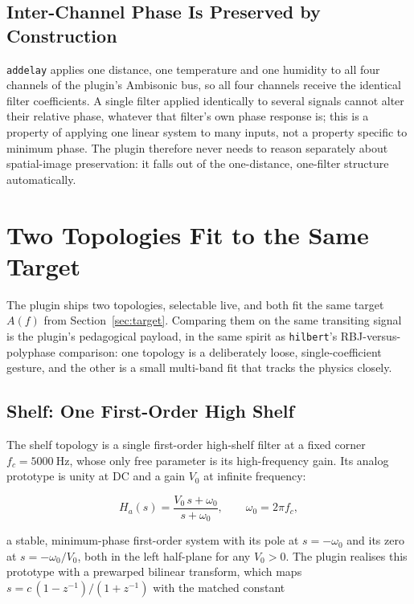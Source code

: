 \documentclass[11pt,a4paper]{article}
\begin{document}
\subsection{Inter-Channel Phase Is Preserved by Construction}

\texttt{addelay} applies one distance, one temperature and one humidity to all four channels of the plugin's Ambisonic bus, so all four channels receive the identical filter coefficients.
A single filter applied identically to several signals cannot alter their relative phase, whatever that filter's own phase response is; this is a property of applying one linear system to many inputs, not a property specific to minimum phase.
The plugin therefore never needs to reason separately about spatial-image preservation: it falls out of the one-distance, one-filter structure automatically.

\section{Two Topologies Fit to the Same Target}
\label{sec:topologies}

The plugin ships two topologies, selectable live, and both fit the same target $A(f)$ from Section~\ref{sec:target}.
Comparing them on the same transiting signal is the plugin's pedagogical payload, in the same spirit as \texttt{hilbert}'s RBJ-versus-polyphase comparison: one topology is a deliberately loose, single-coefficient gesture, and the other is a small multi-band fit that tracks the physics closely.

\subsection{Shelf: One First-Order High Shelf}
\label{sec:shelf}

The shelf topology is a single first-order high-shelf filter at a fixed corner $f_c = \SI{5000}{\hertz}$, whose only free parameter is its high-frequency gain.
Its analog prototype is unity at DC and a gain $V_0$ at infinite frequency:

\begin{equation}
H_a(s) = \frac{V_0 \, s + \omega_0}{s + \omega_0} ,
\qquad \omega_0 = 2\pi f_c ,
\end{equation}

a stable, minimum-phase first-order system with its pole at $s=-\omega_0$ and its zero at $s=-\omega_0/V_0$, both in the left half-plane for any $V_0 > 0$.
The plugin realises this prototype with a prewarped bilinear transform, which maps $s = c\,(1-z^{-1})/(1+z^{-1})$ with the matched constant
\end{document}
